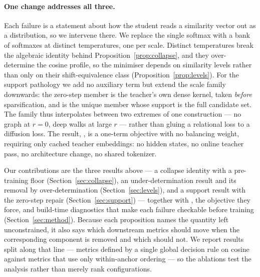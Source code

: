 \paragraph{One change addresses all three.}
Each failure is a statement about how the student reads a similarity vector out as a
distribution, so we intervene there. We replace the single softmax with a bank of softmaxes
at distinct temperatures, one per scale. Distinct temperatures break the algebraic identity
behind Proposition~\ref{prop:collapse}, and they over-determine the cosine profile, so the
minimiser depends on similarity levels rather than only on their shift-equivalence class
(Proposition~\ref{prop:levels}). For the support pathology we add no auxiliary term but
extend the scale family downwards: the zero-step member is the teacher's own dense kernel,
taken \emph{before} sparsification, and is the unique member whose support is the full
candidate set. The family thus interpolates between two extremes of one construction --- no
graph at $r=0$, deep walks at large $r$ --- rather than gluing a relational loss to a
diffusion loss. The result, \method, is a one-term objective with no balancing weight,
requiring only cached teacher embeddings: no hidden states, no online teacher pass, no
architecture change, no shared tokenizer.

Our contributions are the three results above --- a collapse identity with a pre-training
floor (Section~\ref{sec:collapse}), an under-determination result and its removal by
over-determination (Section~\ref{sec:levels}), and a support result with the zero-step
repair (Section~\ref{sec:support}) --- together with \method, the objective they force, and
build-time diagnostics that make each failure checkable before training
(Section~\ref{sec:method}). Because each proposition names the quantity left unconstrained,
it also says which downstream metrics should move when the corresponding component is
removed and which should not. We report results split along that line --- metrics defined by
a single global decision rule on cosine against metrics that use only within-anchor ordering
--- so the ablations test the analysis rather than merely rank configurations.
